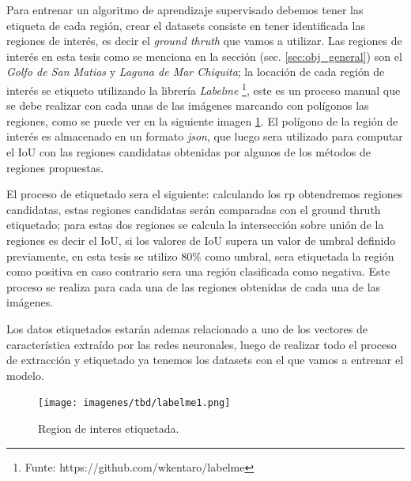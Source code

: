 Para entrenar un algoritmo de aprendizaje supervisado debemos tener las etiqueta de cada región, crear el datasets consiste en tener identificada las regiones de interés, es decir el \textit{ground thruth} que vamos a utilizar. Las regiones de interés en esta tesis como se menciona en la sección (sec. \ref{sec:obj_general}) son el \textit{Golfo de San Matias} y  \textit{Laguna de Mar Chiquita}; la locación de cada región de interés se etiqueto utilizando la librería \textit{Labelme} \footnote{Funte: https://github.com/wkentaro/labelme}, este es un proceso manual que se debe realizar con cada unas de las imágenes marcando con polígonos las regiones, como se puede ver en la siguiente imagen \ref{Fig:labelme-etiquetado}. El polígono de la región de interés es almacenado en un formato \textit{json}, que luego sera utilizado para computar el IoU con las regiones candidatas obtenidas por algunos de los métodos de regiones propuestas. 

El proceso de etiquetado sera el siguiente: calculando los \ac{rp} obtendremos regiones candidatas, estas regiones candidatas serán comparadas con el ground thruth etiquetado; para estas dos regiones se calcula la intersección sobre unión de la regiones es decir el IoU, si los valores de IoU supera un valor de umbral definido previamente, en esta tesis se utilizo $80\%$ como umbral, sera etiquetada la región como positiva en caso contrario sera una región clasificada como negativa. Este proceso se realiza para cada una de las regiones obtenidas de cada una de las imágenes. 


Los datos etiquetados estarán ademas relacionado a uno de los vectores de característica extraído por las redes neuronales, luego de realizar todo el proceso de extracción y etiquetado ya tenemos los datasets con el que vamos a entrenar el modelo.



\begin{figure}[H] \centering
  \texttt{[image: imagenes/tbd/labelme1.png]}
  \caption{Region de interes etiquetada.}\label{Fig:labelme-etiquetado}
\end{figure}

